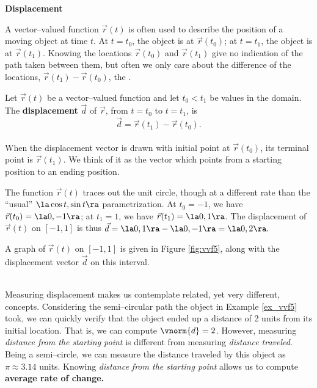 \noindent\textbf{\large Displacement}\\

\addtocounter{figure}{1}

A vector--valued function $\vec r(t)$ is often used to describe the position of a moving object at time $t$. At $t=t_0$, the object is at $\vec r(t_0)$; at $t=t_1$, the object is at $\vec r(t_1)$. Knowing the locations $\vec r(t_0)$ and $\vec r(t_1)$ give no indication of the path taken between them, but often we only care about the difference of the locations, $\vec r(t_1)-\vec r(t_0)$, the .

{Let $\vec r(t)$ be a vector--valued function and let $t_0<t_1$ be values in the domain. The \textbf{displacement} $\vec d$ of $\vec r$, from $t=t_0$ to $t=t_1$, is $$\vec d=\vec r(t_1)-\vec r(t_0).$$
}\\

When the displacement vector is drawn with initial point at $\vec r(t_0)$, its terminal point is $\vec r(t_1)$. We think of it as the vector which points from a starting position to an ending position.\\

{The function $\vec r(t)$ traces out the unit circle, though at a different rate than the ``usual'' $\la \cos t,\sin t\ra$ parametrization. At $t_0=-1$, we have $\vec r(t_0) = \la 0,-1\ra$; at $t_1=1$, we have $\vec r(t_1) = \la 0,1\ra$. The displacement of $\vec r(t)$ on $[-1,1]$ is thus $\vec d = \la 0,1\ra - \la 0,-1\ra = \la 0,2\ra.$

A graph of $\vec r(t)$ on $[-1,1]$ is given in Figure \ref{fig:vvf5}, along with the displacement vector $\vec d$ on this interval.
}\\

Measuring displacement makes us contemplate related, yet very different, concepts. Considering the semi--circular path the object in Example \ref{ex_vvf5} took, we can quickly verify that the object ended up a distance of 2 units from its initial location. That is, we can compute $\vnorm{d} = 2$. However, measuring \emph{distance from the starting point} is different from measuring \emph{distance traveled}. Being a semi--circle, we can measure the distance traveled by this object as $\pi\approx 3.14$ units. Knowing \emph{distance from the starting point} allows us to compute \textbf{average rate of change.}

